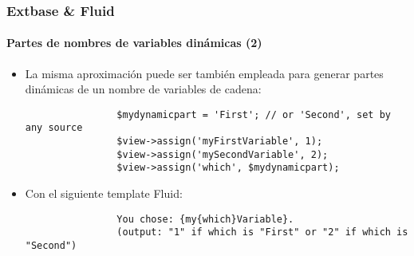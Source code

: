 \begin{frame}[fragile]
	\frametitle{Extbase \& Fluid}
	\framesubtitle{Partes de nombres de variables dinámicas (2)}

	\lstset{basicstyle=\tiny\ttfamily}

	\begin{itemize}

		\item La misma aproximación puede ser también empleada para generar partes dinámicas de un nombre de variables
			de cadena:

			\begin{lstlisting}
				$mydynamicpart = 'First'; // or 'Second', set by any source
				$view->assign('myFirstVariable', 1);
				$view->assign('mySecondVariable', 2);
				$view->assign('which', $mydynamicpart);
			\end{lstlisting}

		\item Con el siguiente template Fluid:

			\begin{lstlisting}
				You chose: {my{which}Variable}.
				(output: "1" if which is "First" or "2" if which is "Second")
			\end{lstlisting}

	\end{itemize}

\end{frame}


